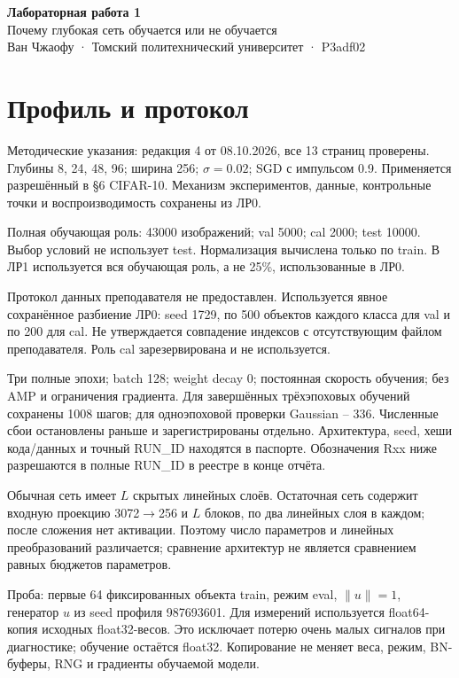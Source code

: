 \documentclass[10pt,a4paper]{article}
\begin{document}
\begin{center}{\Large\bfseries Лабораторная работа 1}\\[4pt]
Почему глубокая сеть обучается или не обучается\\
Ван Чжаофу · Томский политехнический университет · P3adf02
\end{center}
\section{Профиль и протокол}
Методические указания: редакция 4 от 08.10.2026, все 13 страниц проверены. Глубины 8, 24, 48, 96; ширина 256; $\sigma=0.02$; SGD с импульсом 0.9. Применяется разрешённый в §6 CIFAR-10. Механизм экспериментов, данные, контрольные точки и воспроизводимость сохранены из ЛР0.


Полная обучающая роль: 43000 изображений; val 5000; cal 2000; test 10000. Выбор условий не использует test. Нормализация вычислена только по train. В ЛР1 используется вся обучающая роль, а не 25\%, использованные в ЛР0.

Протокол данных преподавателя не предоставлен. Используется явное сохранённое разбиение ЛР0: seed 1729, по 500 объектов каждого класса для val и по 200 для cal. Не утверждается совпадение индексов с отсутствующим файлом преподавателя. Роль cal зарезервирована и не используется.

Три полные эпохи; batch 128; weight decay 0; постоянная скорость обучения; без AMP и ограничения градиента. Для завершённых трёхэпоховых обучений сохранены 1008 шагов; для одноэпоховой проверки Gaussian -- 336. Численные сбои остановлены раньше и зарегистрированы отдельно. Архитектура, seed, хеши кода/данных и точный RUN\_ID находятся в паспорте. Обозначения Rxx ниже разрешаются в полные RUN\_ID в реестре в конце отчёта.

Обычная сеть имеет $L$ скрытых линейных слоёв. Остаточная сеть содержит входную проекцию 3072$\to$256 и $L$ блоков, по два линейных слоя в каждом; после сложения нет активации. Поэтому число параметров и линейных преобразований различается; сравнение архитектур не является сравнением равных бюджетов параметров.

Проба: первые 64 фиксированных объекта train, режим eval, $\|u\|=1$, генератор $u$ из seed профиля 987693601. Для измерений используется float64-копия исходных float32-весов. Это исключает потерю очень малых сигналов при диагностике; обучение остаётся float32. Копирование не меняет веса, режим, BN-буферы, RNG и градиенты обучаемой модели.
\end{document}

